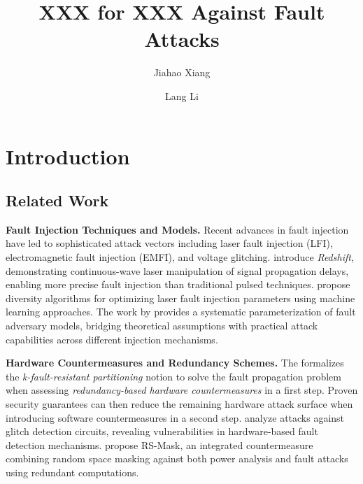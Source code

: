 \documentclass[journal=tches,final]{iacrtrans}
\author{Jiahao Xiang\inst{1} \and Lang Li\inst{1}}
\institute{
  Hengyang Normal University, College of Computer Science and Technology, Hengyang, China
}
\title{ XXX for XXX Against Fault Attacks}
\begin{document}
\maketitle




\begin{abstract}

\end{abstract}


\section{Introduction}

\color{blue}

\subsection{Related Work}

\textbf{Fault Injection Techniques and Models.} Recent advances in fault injection have led to sophisticated attack vectors including laser fault injection (LFI), electromagnetic fault injection (EMFI), and voltage glitching. \cite{TCHES:YamBurFu22} introduce \textit{Redshift}, demonstrating continuous-wave laser manipulation of signal propagation delays, enabling more precise fault injection than traditional pulsed techniques. \cite{ESORICS:KrcOrd24} propose diversity algorithms for optimizing laser fault injection parameters using machine learning approaches. The work by \cite{ESORICS:TopNikNik24} provides a systematic parameterization of fault adversary models, bridging theoretical assumptions with practical attack capabilities across different injection mechanisms.

\textbf{Hardware Countermeasures and Redundancy Schemes.} The \cite{TCHES:THNABC24} formalizes the \textit{k-fault-resistant partitioning} notion to solve the fault propagation problem when assessing \textit{redundancy-based hardware countermeasures} in a first step. Proven security guarantees can then reduce the remaining hardware attack surface when introducing software countermeasures in a second step. \cite{TCHES:AskNikNik24} analyze attacks against glitch detection circuits, revealing vulnerabilities in hardware-based fault detection mechanisms. \cite{IEEE-TCAD:RamAmp20} propose RS-Mask, an integrated countermeasure combining random space masking against both power analysis and fault attacks using redundant computations.
\end{document}
